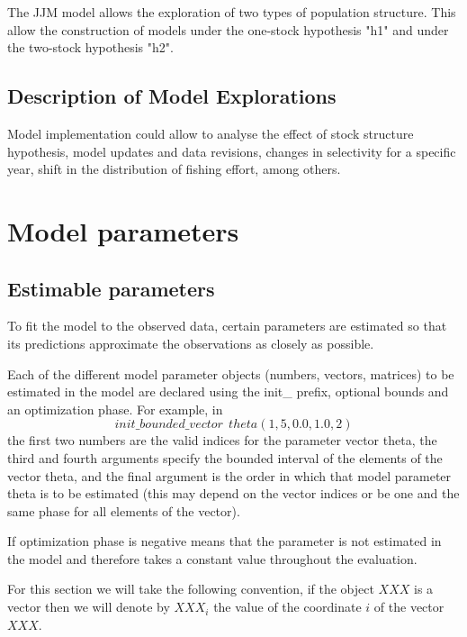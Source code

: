 \documentclass{article}
\begin{document}
The JJM model allows the exploration of two types of population structure. This allow the construction of models under the one-stock hypothesis "h1" and under the two-stock hypothesis "h2".

\subsection{Description of Model Explorations}

Model implementation could allow to analyse the effect of stock structure hypothesis, model updates and data revisions, changes in selectivity for a specific year, shift in the distribution of fishing effort, among others. 

\section{Model parameters}


\subsection{Estimable parameters}
To fit the model to the observed data, certain parameters are estimated so that its predictions approximate the observations as closely as possible.

Each of the different model parameter objects (numbers, vectors, matrices)  to be estimated in the model are declared using the init\_ prefix, optional bounds and an optimization phase. For example, in
\begin{equation*}
    init\_bounded\_vector \ \ theta(1,5,0.0,1.0,2)
\end{equation*}
the first two numbers are the valid indices for the parameter vector theta, the third and fourth arguments specify the bounded interval of the elements of the vector theta, and the final argument is the order in which that model parameter theta is to be estimated (this may depend on the vector indices or be one and the same phase for all elements of the vector). 

If optimization phase is negative means that the parameter is not estimated in the model and therefore takes a constant value throughout the evaluation.



For this section we will take the following convention, if the object $XXX$ is a vector then we will denote by $XXX_i$ the value of the coordinate $i$ of the vector $XXX$. \\
\end{document}
